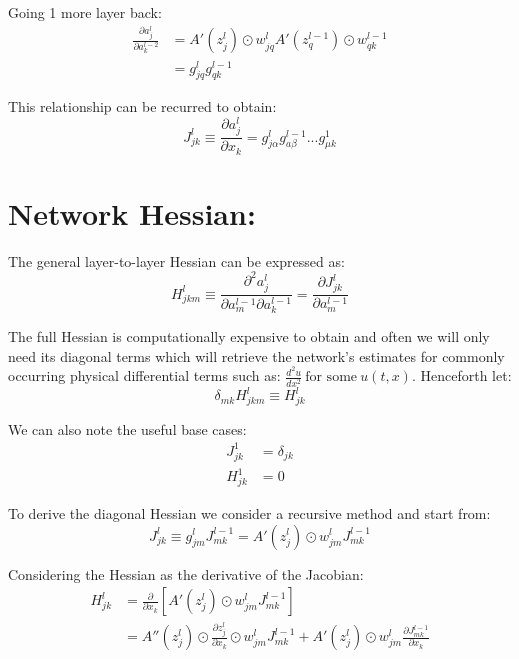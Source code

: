 \documentclass{article}
\begin{document}
Going 1 more layer back:
\begin{align}
\frac{\partial a_j^l}{\partial a_k^{l-2}} &= A'(z_j^l) \odot w_{jq}^l A'(z_q^{l-1}) \odot w_{qk}^{l-1} \\
&= g_{jq}^l g_{qk}^{l-1}
\end{align}

This relationship can be recurred to obtain:
\begin{equation}
J_{jk}^{l} \equiv \frac{\partial a_j^l}{\partial x_k} = g_{j\alpha}^l g_{a\beta}^{l-1} ... g_{\mu k}^{1}
\end{equation}

\section*{Network Hessian:}
The general layer-to-layer Hessian can be expressed as:
\begin{equation}
H_{jkm}^l \equiv \frac{\partial^2 a_j^l}{\partial a_m^{l-1} \partial a_k^{l-1}} = \frac{\partial J_{jk}^l}{\partial a_m^{l-1}}
\end{equation}

The full Hessian is computationally expensive to obtain and often we will only need its diagonal terms which will retrieve the network's estimates for commonly occurring physical differential terms such as: \(\frac{d^2u}{dx^2} \ \text{for some} \ u(t, x)\). Henceforth let:
\begin{equation}
\delta_{mk}H_{jkm}^l \equiv H_{jk}^l
\end{equation}

We can also note the useful base cases:
\begin{align}
J_{jk}^1 &= \delta_{jk} \\
H_{jk}^1 &= 0
\end{align}

To derive the diagonal Hessian we consider a recursive method and start from:
\begin{equation}
J_{jk}^l \equiv g_{jm}^l J_{mk}^{l-1} = A'(z_j^l) \odot w_{jm}^l J_{mk}^{l-1}
\end{equation}

Considering the Hessian as the derivative of the Jacobian:
\begin{align}
H_{jk}^l &= \frac{\partial}{\partial x_k} \left[ A'(z_j^l) \odot w_{jm}^l J_{mk}^{l-1} \right] \\
&= A''(z_j^l) \odot \frac{\partial z_j^l}{\partial x_k} \odot w_{jm}^l J_{mk}^{l-1} + A'(z_j^l) \odot w_{jm}^l \frac{\partial J_{mk}^{l-1}}{\partial x_k}
\end{align}
\end{document}
